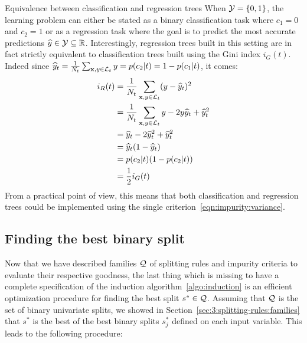 \begin{remark}{Equivalence between classification and regression trees}
When ${\cal Y} = \{0, 1\}$, the learning problem can either be
stated as a binary classification task where $c_1=0$ and $c_2=1$ or as a regression
task where the goal is to predict the most accurate predictions $\widehat{y} \in {\cal Y} \subseteq \mathbb{R}$.
Interestingly, regression trees built in this setting are in fact strictly
equivalent to classification trees built using the Gini index $i_G(t)$. Indeed since $\widehat{y}_t = \tfrac{1}{N_t} \sum_{\mathbf{x}, y \in {\cal L}_t} y = p(c_2|t) = 1 - p(c_1|t)$, it comes:
\begin{align}
i_R(t) &= \frac{1}{N_t} \sum_{\mathbf{x}, y \in {\cal L}_t} (y - \widehat{y}_t)^2 \nonumber \\
       &= \frac{1}{N_t} \sum_{\mathbf{x}, y \in {\cal L}_t} y - 2 y \widehat{y}_t + \widehat{y}_t^2 \nonumber \\
       &= \widehat{y}_t - 2 \widehat{y}_t^2 + \widehat{y}_t^2 \nonumber \\
       &= \widehat{y}_t (1 - \widehat{y}_t) \nonumber \\
       &= p(c_2|t) (1 - p(c_2|t)) \nonumber \\
       &= \frac{1}{2} i_G(t)
\end{align}
From a practical point of view, this means that both classification and
regression trees could be implemented using the single criterion~\ref{eqn:impurity:variance}.
\end{remark}

\subsection{Finding the best binary split}

Now that we have described families ${\cal Q}$ of splitting rules and impurity
criteria to evaluate their respective goodness, the last thing which is missing
to have a complete specification of the induction
algorithm~\ref{algo:induction} is an efficient optimization procedure for
finding the best split $s^* \in {\cal Q}$. Assuming that ${\cal Q}$ is the set
of binary univariate splits, we showed in Section~\ref{sec:3:splitting-rules:families}
that $s^*$ is the best of the best binary splits $s^*_j$
defined on each input variable. This leads to the following procedure:


